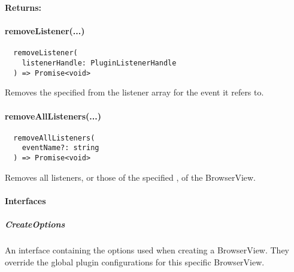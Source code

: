 \textbf{Returns:} 


\paragraph{removeListener(...)}

\begin{verbatim}
  removeListener(
    listenerHandle: PluginListenerHandle
  ) => Promise<void>
\end{verbatim}

Removes the specified  from the listener array for the event it refers to.


\paragraph{removeAllListeners(...)}

\begin{verbatim}
  removeAllListeners(
    eventName?: string
  ) => Promise<void>
\end{verbatim}

Removes all listeners, or those of the specified , of the BrowserView.


\newpage

\paragraph{Interfaces}


\subparagraph{CreateOptions}

An interface containing the options used when creating a BrowserView.
They override the global plugin configurations for this specific BrowserView.

